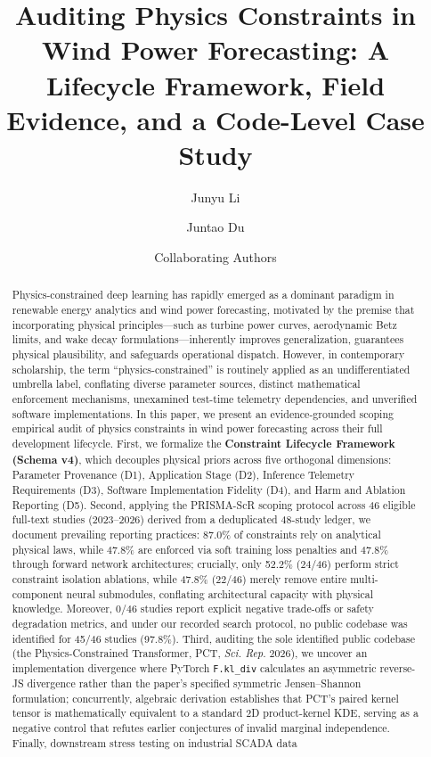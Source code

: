 \documentclass[preprint,3p,times]{elsarticle}
\begin{document}
\begin{frontmatter}

\title{Auditing Physics Constraints in Wind Power Forecasting: A Lifecycle Framework, Field Evidence, and a Code-Level Case Study}

\author[1]{Junyu Li}
\author[2]{Juntao Du}
\author[1]{Collaborating Authors}

\address[1]{School of Electrical and Information Engineering, China}
\address[2]{Independent Empirical Audit Group, China}


\begin{abstract}
Physics-constrained deep learning has rapidly emerged as a dominant paradigm in renewable energy analytics and wind power forecasting, motivated by the premise that incorporating physical principles---such as turbine power curves, aerodynamic Betz limits, and wake decay formulations---inherently improves generalization, guarantees physical plausibility, and safeguards operational dispatch. However, in contemporary scholarship, the term ``physics-constrained'' is routinely applied as an undifferentiated umbrella label, conflating diverse parameter sources, distinct mathematical enforcement mechanisms, unexamined test-time telemetry dependencies, and unverified software implementations. In this paper, we present an evidence-grounded scoping empirical audit of physics constraints in wind power forecasting across their full development lifecycle. First, we formalize the \textbf{Constraint Lifecycle Framework (Schema v4)}, which decouples physical priors across five orthogonal dimensions: Parameter Provenance (D1), Application Stage (D2), Inference Telemetry Requirements (D3), Software Implementation Fidelity (D4), and Harm and Ablation Reporting (D5). Second, applying the PRISMA-ScR scoping protocol across 46 eligible full-text studies (2023--2026) derived from a deduplicated 48-study ledger, we document prevailing reporting practices: 87.0\% of constraints rely on analytical physical laws, while 47.8\% are enforced via soft training loss penalties and 47.8\% through forward network architectures; crucially, only 52.2\% (24/46) perform strict constraint isolation ablations, while 47.8\% (22/46) merely remove entire multi-component neural submodules, conflating architectural capacity with physical knowledge. Moreover, 0/46 studies report explicit negative trade-offs or safety degradation metrics, and under our recorded search protocol, no public codebase was identified for 45/46 studies (97.8\%). Third, auditing the sole identified public codebase (the Physics-Constrained Transformer, PCT, \textit{Sci. Rep.} 2026), we uncover an implementation divergence where PyTorch \texttt{F.kl\_div} calculates an asymmetric reverse-JS divergence rather than the paper's specified symmetric Jensen--Shannon formulation; concurrently, algebraic derivation establishes that PCT's paired kernel tensor is mathematically equivalent to a standard 2D product-kernel KDE, serving as a negative control that refutes earlier conjectures of invalid marginal independence. Finally, downstream stress testing on industrial SCADA data 
\end{abstract}
\end{frontmatter}
\end{document}
